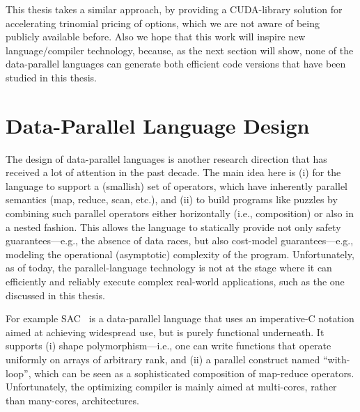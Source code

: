 This thesis takes a similar approach, by providing a CUDA-library solution for accelerating trinomial pricing of options, which we are not aware of being publicly available before. Also we hope that this work will inspire new language/compiler technology, because, as the next section will show, none of the data-parallel languages can generate both efficient code versions that have been studied in this thesis.


\section{Data-Parallel Language Design}
\label{relwork-lang}

The design of data-parallel languages is another research direction that has received a lot of attention in the past decade. The main idea here is (i) for the language to support a (smallish) set of operators, which have inherently parallel semantics (map, reduce, scan, etc.), and (ii) to build programs like puzzles by combining such parallel operators either horizontally (i.e., composition) or also in a nested fashion. This allows the language to statically provide not only safety guarantees---e.g., the absence of data races, but also cost-model guarantees---e.g., modeling the operational (asymptotic) complexity of the program.   Unfortunately, as of today, the parallel-language technology is not at the stage where it can efficiently and reliably execute complex real-world applications, such as the one discussed in this thesis.

For example SAC~\cite{SaCShared2005,GrelSchoIJPP06,HybType} is a data-parallel language that uses an imperative-C notation aimed at achieving widespread use, but is purely functional underneath.   It supports (i) shape polymorphism---i.e., one can write functions that operate uniformly on arrays of arbitrary rank, and (ii) a parallel construct named ``with-loop'', which can be seen as a sophisticated composition of map-reduce operators.   Unfortunately, the optimizing compiler is mainly aimed at multi-cores, rather than many-cores, architectures.

